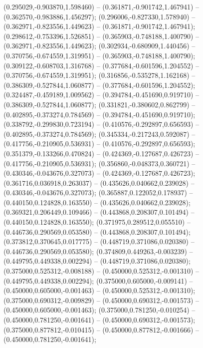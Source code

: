  (0.295029,-0.903870,1.598460) -- (0.361871,-0.901742,1.467941) -- (0.362570,-0.983886,1.456297);
 (0.296006,-0.827330,1.578940) -- (0.362971,-0.823556,1.449623) -- (0.361871,-0.901742,1.467941);
 (0.298612,-0.753396,1.526851) -- (0.365903,-0.748188,1.400790) -- (0.362971,-0.823556,1.449623);
 (0.302934,-0.680909,1.440456) -- (0.370756,-0.674559,1.319951) -- (0.365903,-0.748188,1.400790);
 (0.309122,-0.608703,1.316768) -- (0.377684,-0.601596,1.204552) -- (0.370756,-0.674559,1.319951);
 (0.316856,-0.535278,1.162168) -- (0.386309,-0.527844,1.060877) -- (0.377684,-0.601596,1.204552);
 (0.324487,-0.459189,1.009562) -- (0.394784,-0.451690,0.919710) -- (0.386309,-0.527844,1.060877);
 (0.331821,-0.380602,0.862799) -- (0.402895,-0.373274,0.784569) -- (0.394784,-0.451690,0.919710);
 (0.338792,-0.299830,0.723194) -- (0.410576,-0.292897,0.656593) -- (0.402895,-0.373274,0.784569);
 (0.345334,-0.217243,0.592087) -- (0.417756,-0.210905,0.536931) -- (0.410576,-0.292897,0.656593);
 (0.351379,-0.133266,0.470824) -- (0.424369,-0.127687,0.426723) -- (0.417756,-0.210905,0.536931);
 (0.356860,-0.048373,0.360721) -- (0.430346,-0.043676,0.327073) -- (0.424369,-0.127687,0.426723);
 (0.361716,0.036918,0.263037) -- (0.435626,0.040662,0.239028) -- (0.430346,-0.043676,0.327073);
 (0.365887,0.122052,0.178937) -- (0.440150,0.124828,0.163550) -- (0.435626,0.040662,0.239028);
 (0.369321,0.206449,0.109466) -- (0.443868,0.208307,0.101494) -- (0.440150,0.124828,0.163550);
 (0.371975,0.289512,0.055510) -- (0.446736,0.290569,0.053580) -- (0.443868,0.208307,0.101494);
 (0.373812,0.370645,0.017775) -- (0.448719,0.371086,0.020380) -- (0.446736,0.290569,0.053580);
 (0.374809,0.449263,-0.003239) -- (0.449795,0.449338,0.002294) -- (0.448719,0.371086,0.020380);
 (0.375000,0.525312,-0.008188) -- (0.450000,0.525312,-0.001310) -- (0.449795,0.449338,0.002294);
 (0.375000,0.605000,-0.009141) -- (0.450000,0.605000,-0.001463) -- (0.450000,0.525312,-0.001310);
 (0.375000,0.690312,-0.009829) -- (0.450000,0.690312,-0.001573) -- (0.450000,0.605000,-0.001463);
 (0.375000,0.781250,-0.010254) -- (0.450000,0.781250,-0.001641) -- (0.450000,0.690312,-0.001573);
 (0.375000,0.877812,-0.010415) -- (0.450000,0.877812,-0.001666) -- (0.450000,0.781250,-0.001641);
